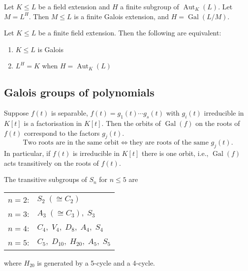 \documentclass{article}
\DeclareMathOperator{\Aut}{Aut}
\DeclareMathOperator{\Gal}{Gal}
\begin{document}

\begin{nthm}\label{thm:3.3}
    Let $K \leq L$ be a field extension and $H$ a finite subgroup of $\Aut_K(L)$.
    Let $M = L^H$.
    Then $M \leq L$ is a finite Galois extension, and $H = \Gal(L/M)$.
\end{nthm}


\begin{nthm}\label{thm:3.4}
    Let $K \leq L$ be a finite field extension. Then the following are equivalent:
    \begin{enumerate}[label=(\roman*)]
        \item $K \leq L$ is Galois
        \item $L^H = K$ when $H = \Aut_K(L)$
    \end{enumerate}
\end{nthm}



\subsection{Galois groups of polynomials}

















\begin{nlemma}\label{lem:3.6}
    Suppose $f(t)$ is separable, $f(t) = g_1(t) \dotsm g_s(t)$ with $g_i(t)$ irreducible in $K[t]$ is a factorisation in $K[t]$.
    Then the orbits of $\Gal(f)$ on the roots of $f(t)$ correspond to the factors $g_j(t)$.
    \begin{equation*}
        \text{Two roots are in the same orbit} \iff \text{they are roots of the same } g_j(t).
    \end{equation*}
    In particular, if $f(t)$ is irreducible in $K[t]$ there is one orbit, i.e., $\Gal(f)$ acts transitively on the roots of $f(t)$.
\end{nlemma}



\begin{nlemma}\label{lem:3.7}
    The transitive subgroups of $S_n$ for $n \leq 5$ are
    \begin{center}
        \begin{tabular}{rl}
            $n=2$:  & $S_2 \; (\cong C_2)$ \\
            $n=3$:  & $A_3 \; (\cong C_3), \; S_3$ \\
            $n=4$:  & $C_4, \; V_4, \; D_8, \; A_4, \; S_4$ \\
            $n=5$:  & $C_5, \; D_{10}, \; H_{20}, \; A_5, \; S_5$\\
        \end{tabular}
    \end{center}
    where $H_{20}$ is generated by a 5-cycle and a 4-cycle.
\end{nlemma}
\end{document}
